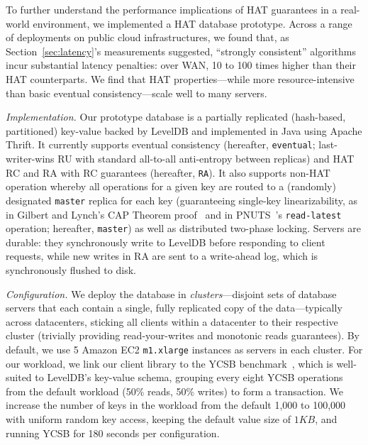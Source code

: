 To further understand the performance implications of HAT guarantees
in a real-world environment, we implemented a HAT database
prototype. Across a range of deployments on public cloud
infrastructures, we found that, as Section~\ref{sec:latency}'s
measurements suggested, ``strongly consistent'' algorithms incur
substantial latency penalties: over WAN, 10 to 100 times higher than
their HAT counterparts. We find that HAT
properties---while more resource-intensive than basic eventual
consistency---scale well to many servers.

\vspace{.5em}\noindent\textit{Implementation.} Our prototype database
is a partially replicated (hash-based, partitioned) key-value backed
by LevelDB and implemented in Java using Apache Thrift. It currently
supports eventual consistency (hereafter, \texttt{eventual};
last-writer-wins RU with standard all-to-all anti-entropy between
replicas) and HAT RC and RA with RC guarantees (hereafter,
\texttt{RA}). It also supports non-HAT operation whereby all
operations for a given key are routed to a (randomly) designated
\texttt{master} replica for each key (guaranteeing single-key
linearizability, as in Gilbert and Lynch's CAP Theorem
proof~\cite{gilbert-cap} and in PNUTS~\cite{pnuts}'s
\texttt{read-latest} operation; hereafter, \texttt{master}) as well as
distributed two-phase locking. Servers are durable: they synchronously
write to LevelDB before responding to client requests, while new
writes in RA are sent to a write-ahead log, which is synchronously
flushed to disk.

\vspace{.5em}\noindent\textit{Configuration.} We deploy the database
in \textit{clusters}---disjoint sets of database servers that each
contain a single, fully replicated copy of the data---typically across
datacenters, sticking all clients within a datacenter to their
respective cluster (trivially providing read-your-writes and monotonic
reads guarantees). By default, we use 5 Amazon EC2 \texttt{m1.xlarge}
instances as servers in each cluster. For our workload, we link our
client library to the YCSB benchmark~\cite{ycsb}, which is well-suited
to LevelDB's key-value schema, grouping every eight YCSB operations
from the default workload (50\% reads, 50\% writes) to form a
transaction. We increase the number of keys in the workload from the
default 1,000 to 100,000 with uniform random key access, keeping
the default value size of $1KB$, and running YCSB for 180 seconds per
configuration.

